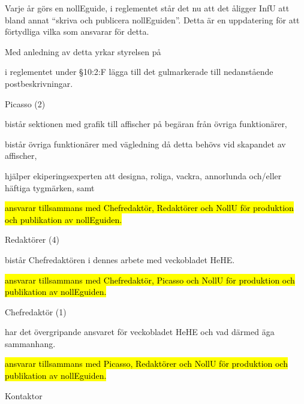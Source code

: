 \documentclass[../_main/handlingar.tex]{subfiles}
\begin{document}
Varje år görs en nollEguide, i reglementet står det nu att det åligger InfU att bland annat ``skriva och publicera nollEguiden''. Detta är en uppdatering för att förtydliga vilka som ansvarar för detta.

Med anledning av detta yrkar styrelsen på
\begin{attsatser}
    \att i reglementet under \S10:2:F lägga till det gulmarkerade till nedanstående postbeskrivningar.\par
    Picasso (2)
    \begin{dashlist}
            \item bistår sektionen med grafik till affischer på begäran från övriga funktionärer,
            \item bistår övriga funktionärer med vägledning då detta behövs vid skapandet av affischer,
            \item hjälper ekiperingsexperten att designa, roliga, vackra, annorlunda och/eller häftiga tygmärken, samt
            \item \hl{ansvarar tillsammans med Chefredaktör, Redaktörer och NollU för produktion och publikation av nollEguiden.}
        \end{dashlist}
        Redaktörer (4)
      		\begin{dashlist}
      			\item bistår Chefredaktören i dennes arbete med veckobladet HeHE.
            \item \hl{ansvarar tillsammans med Chefredaktör, Picasso och NollU för produktion och publikation av nollEguiden.}
          \end{dashlist}
          Chefredaktör (1)
          		\begin{dashlist}
          			\item har det övergripande ansvaret för veckobladet HeHE och vad därmed äga sammanhang.
                \item \hl{ansvarar tillsammans med Picasso, Redaktörer och NollU för produktion och publikation av nollEguiden.}
          		\end{dashlist}

\end{attsatser}

\begin{signatures}{1}
    \ist
    \signature{\sekr}{Kontaktor}
\end{signatures}
\end{document}
